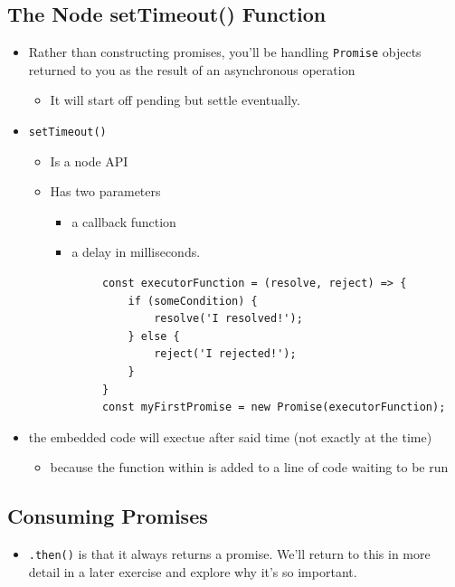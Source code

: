 \documentclass[12pt]{article}
\begin{document}
\subsection{The Node setTimeout() Function}
\begin{itemize}

    \item Rather than constructing promises, you’ll be handling \texttt{Promise} objects returned to you as the result of an asynchronous operation
    \begin{itemize}
        \item It will start off pending but settle eventually.
    \end{itemize}

    \item \texttt{setTimeout()}
    \begin{itemize}
        \item Is a node API
        \item Has two parameters
        \begin{itemize}
            \item a callback function
            \item a delay in milliseconds.
        \end{itemize}

        \begin{lstlisting}
        const executorFunction = (resolve, reject) => {
            if (someCondition) {
                resolve('I resolved!');
            } else {
                reject('I rejected!');
            }
        }
        const myFirstPromise = new Promise(executorFunction);
        \end{lstlisting}

    \end{itemize}

    \item the embedded code will exectue after said time (not exactly at the time)
    \begin{itemize}
        \item because the function within is added to a line of code waiting to be run
    \end{itemize}
\end{itemize}

\subsection{Consuming Promises}
\begin{itemize}
    \item \texttt{.then()} is that it always returns a promise. We’ll return to this in more detail in a later exercise and explore why it’s so important.
\end{itemize}
\end{document}
